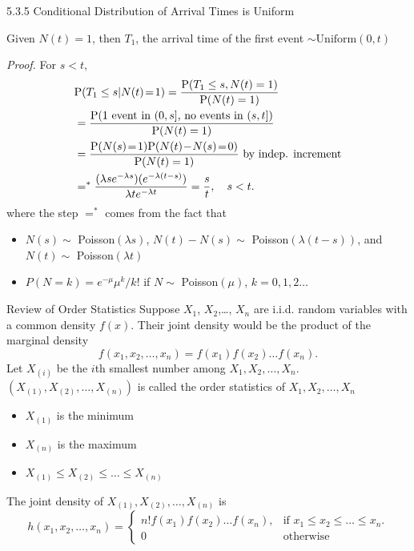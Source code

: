 \documentclass[letterpaper,handout, mathserif]{beamer}
\def\p{\mathrm P}
\begin{document}
\begin{frame}{5.3.5 Conditional Distribution of Arrival Times is Uniform}

Given $N(t)=1$, then $T_1$, the arrival time of the first event $\sim \text{Uniform}(0,t)$

{\em Proof.} For $s<t$,
\begin{align*}\small
&\p(T_1\le s|N(t)\!=\!1)=\frac{\p(T_1\le s, N(t)=1)}{\p(N(t)=1)}\\
&=\frac{\p(\text{1 event in $(0,s]$, no events in $(s,t]$})}{\p(N(t)=1)}\\
&=\frac{\p(N(s)\!=\!1)\p(N(t)\!-\!N(s)\!=\!0)}{\p(N(t)=1)}\text{ by indep. increment}\\
&=^*\frac{(\lambda s e^{-\lambda s})(e^{-\lambda (t-s)})}{\lambda t e^{-\lambda t}}=\frac{s}{t},\quad s< t.
\end{align*}\normalsize
where the step $=^*$ comes from the fact that
\begin{itemize}
\item $N(s)\sim$ Poisson$(\lambda s)$, $N(t)-N(s)\sim$ Poisson$(\lambda (t-s))$, and $N(t)\sim$ Poisson$(\lambda t)$
\item $P(N = k) = e^{-\mu}\mu^k/k!$ if $N\sim$ Poisson$(\mu)$, $k=0,1,2\ldots$
\end{itemize}
\end{frame}
\begin{frame}{Review of Order Statistics}
Suppose $X_1$, $X_2$,\ldots, $X_n$ are i.i.d. random variables with a common density $f(x)$.
Their joint density would be the product of the marginal density
\[
f(x_1,x_2,\ldots,x_n)=f(x_1)f(x_2)\ldots f(x_n).
\]
Let $X_{(i)}$ be the $i$th smallest number among $X_1,X_2,\ldots, X_n$.
$(X_{(1)}, X_{(2)}, \ldots, X_{(n)})$ is called the order statistics of $X_1,X_2,\ldots, X_n$
\begin{itemize}
\item $X_{(1)}$ is the minimum
\item $X_{(n)}$ is the maximum
\item $X_{(1)}\le X_{(2)}\le \ldots\le X_{(n)}$
\end{itemize}
The joint density of $X_{(1)}, X_{(2)}, \ldots, X_{(n)}$ is
\[
h(x_1,x_2,\ldots,x_n)=
\begin{cases}
n!f(x_1)f(x_2)\ldots f(x_n), &\text{if }x_1\le x_2\le\ldots\le x_n.\\
0 &\text{otherwise}
\end{cases}
\]
\end{frame}
\end{document}
